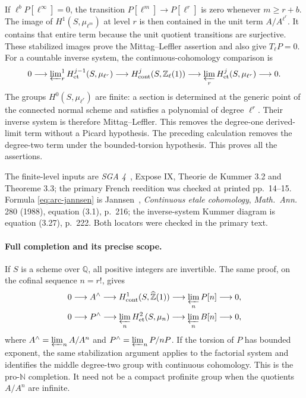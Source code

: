 If \(\ell^bP[\ell^\infty]=0\), the transition
\(P[\ell^m]\longrightarrow P[\ell^r]\) is zero whenever \(m\geq r+b\).
The image of \(H^1(S,\mu_{\ell^m})\) at level \(r\) is then contained in
the unit term \(A/A^{\ell^r}\).  It contains that entire term because
the unit quotient transitions are surjective.  These stabilized images
prove the Mittag--Leffler assertion and also give \(T_\ell P=0\).
For a countable inverse system, the continuous-cohomology comparison is
\begin{equation}\label{eq:arc-jannsen}
 0\longrightarrow \varprojlim\nolimits^1_r
 H^{j-1}_{\mathrm{et}}(S,\mu_{\ell^r})
 \longrightarrow H^j_{\mathrm{cont}}(S,\mathbb Z_\ell(1))
 \longrightarrow \varprojlim_r
 H^j_{\mathrm{et}}(S,\mu_{\ell^r})\longrightarrow 0.
\end{equation}
The groups \(H^0(S,\mu_{\ell^r})\) are finite: a section is determined
at the generic point of the connected normal scheme and satisfies a
polynomial of degree \(\ell^r\).  Their inverse system is therefore
Mittag--Leffler.  This removes the degree-one derived-limit term without
a Picard hypothesis.  The preceding calculation removes the
degree-two term under the bounded-torsion hypothesis.  This proves all
the assertions.

The finite-level inputs are \emph{SGA 4}~\cite{SGA4}, Expose IX,
Theorie de Kummer 3.2 and Theoreme 3.3; the primary French reedition was
checked at printed pp.~14--15.  Formula \eqref{eq:arc-jannsen} is Jannsen~\cite{Jannsen1988},
\emph{Continuous etale cohomology}, \emph{Math.\ Ann.} 280 (1988),
equation (3.1), p.~216; the inverse-system Kummer diagram is
equation (3.27), p.~222.  Both locators were checked in the primary text.

\paragraph{Full completion and its precise scope.}
If \(S\) is a scheme over \(\mathbb Q\), all positive integers are
invertible.  The same proof, on the cofinal sequence \(n=r!\), gives
\begin{align*}
 0&\longrightarrow A^\wedge
 \longrightarrow H^1_{\mathrm{cont}}(S,\widehat{\mathbb Z}(1))
 \longrightarrow \varprojlim_n P[n]\longrightarrow 0,\\
 0&\longrightarrow P^\wedge
 \longrightarrow \varprojlim_n H^2_{\mathrm{et}}(S,\mu_n)
 \longrightarrow \varprojlim_n B[n]\longrightarrow 0,
\end{align*}
where \(A^\wedge=\varprojlim_n A/A^n\) and
\(P^\wedge=\varprojlim_n P/nP\).  If the torsion of \(P\) has bounded
exponent, the same stabilization argument applies to the factorial
system and identifies the middle degree-two group with continuous
cohomology.  This is the pro-\(\mathbb N\) completion.  It need not be
a compact profinite group when the quotients \(A/A^n\) are infinite.

